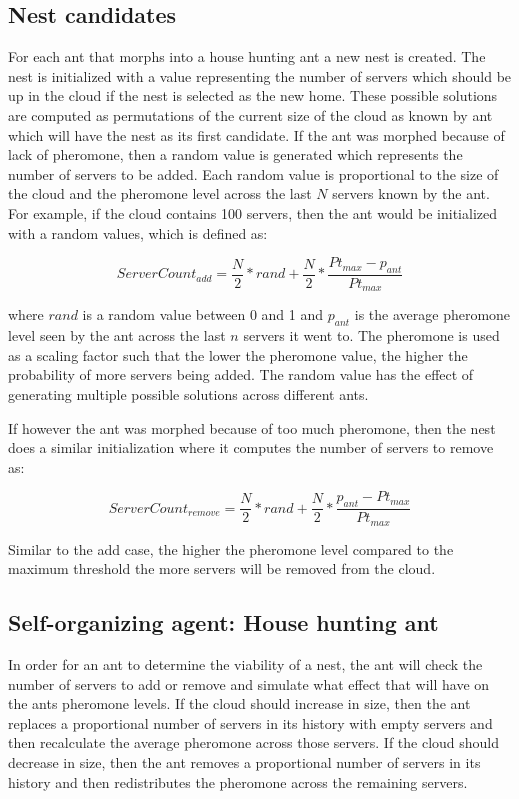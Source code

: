 \documentclass[conference]{IEEEtran}
\begin{document}
\subsection{Nest candidates}

For each ant that morphs into a house hunting ant a new nest is created. The nest is initialized with a value representing the number of servers which should be up in the cloud if the nest is selected as the new home. These possible solutions are computed as permutations of the current size of the cloud as known by ant which will have the nest as its first candidate. If the ant was morphed because of lack of pheromone, then a random value is generated which represents the number of servers to be added. Each random value is proportional to the size of the cloud and the pheromone level across the last $N$ servers known by the ant. For example, if the cloud contains 100 servers, then the ant would be initialized with a random values, which is defined as:

\begin{equation}
ServerCount_{add} = \frac{N}{2} * rand + \frac{N}{2} * \frac{Pt_{max} - p_{ant}}{Pt_{max}}
\end{equation}

where $rand$ is a random value between 0 and 1 and $p_{ant}$ is the average pheromone level seen by the ant across the last $n$ servers it went to. The pheromone is used as a scaling factor such that the lower the pheromone value, the higher the probability of more servers being added. The random value has the effect of generating multiple possible solutions across different ants.

If however the ant was morphed because of too much pheromone, then the nest does a similar initialization where it computes the number of servers to remove as:

\begin{equation}
ServerCount_{remove} = \frac{N}{2} * rand + \frac{N}{2} * \frac{p_{ant} - Pt_{max}}{Pt_{max}}
\end{equation}

Similar to the add case, the higher the pheromone level compared to the maximum threshold the more servers will be removed from the cloud.

\subsection{Self-organizing agent: House hunting ant}

In order for an ant to determine the viability of a nest, the ant will check the number of servers to add or remove and simulate what effect that will have on the ants pheromone levels. If the cloud should increase in size, then the ant replaces a proportional number of servers in its history with empty servers and then recalculate the average pheromone across those servers. If the cloud should decrease in size, then the ant removes a proportional number of servers in its history and then redistributes the pheromone across the remaining servers.
\end{document}
